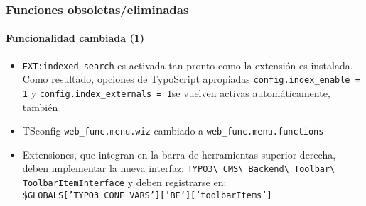 \begin{frame}[fragile]
	\frametitle{Funciones obsoletas/eliminadas}
	\framesubtitle{Funcionalidad cambiada (1)}

	\begin{itemize}

		\item \texttt{EXT:indexed\_search} es activada tan pronto como la extensión es instalada.
			Como resultado, opciones de TypoScript apropiadas \small\texttt{config.index\_enable = 1}\normalsize
			y \small\texttt{config.index\_externals = 1}\normalsize se vuelven activas automáticamente, también
		
		\item TSconfig \small\texttt{web\_func.menu.wiz}\normalsize\space
			cambiado a \small\texttt{web\_func.menu.functions}\normalsize

		\item Extensiones, que integran en la barra de herramientas superior derecha, deben implementar la nueva interfaz:
			\small
				\texttt{TYPO3\textbackslash
					CMS\textbackslash
					Backend\textbackslash
					Toolbar\textbackslash
					ToolbarItemInterface}
			\normalsize\newline
			y deben registrarse en:
			\small
				\texttt{\$GLOBALS['TYPO3\_CONF\_VARS']['BE']['toolbarItems']}
			\normalsize

	\end{itemize}

\end{frame}


